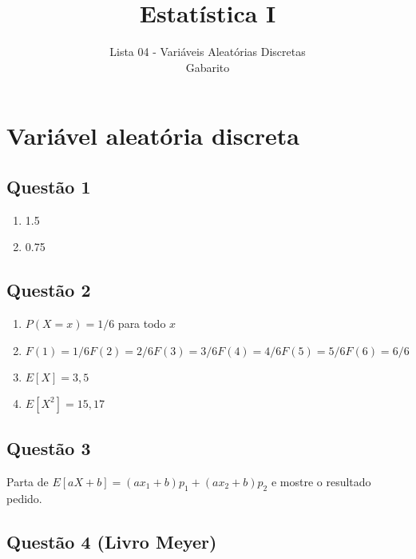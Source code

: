\documentclass[
]{article}
\title{Estatística I}
\subtitle{Lista 04 - Variáveis Aleatórias Discretas\\
Gabarito}
\author{}
\date{\vspace{-2.5em}}
\begin{document}
\maketitle

\hypertarget{variuxe1vel-aleatuxf3ria-discreta}{%
\section{Variável aleatória
discreta}\label{variuxe1vel-aleatuxf3ria-discreta}}

\hypertarget{questuxe3o-1}{%
\subsection{Questão 1}\label{questuxe3o-1}}

\begin{enumerate}
\def\labelenumi{\alph{enumi})}
\item
  1.5
\item
  0.75
\end{enumerate}

\hypertarget{questuxe3o-2}{%
\subsection{Questão 2}\label{questuxe3o-2}}

\begin{enumerate}
\def\labelenumi{\alph{enumi})}
\item
  \(P(X=x) = 1/6\) para todo \(x\)
\item
  \(F(1) = 1/6 F(2) = 2/6 F(3) = 3/6 F(4) = 4/6 F(5) = 5/6 F(6) = 6/6\)
\item
  \(E[X] = 3,5\)
\item
  \(E[X^2] = 15,17\)
\end{enumerate}

\hypertarget{questuxe3o-3}{%
\subsection{Questão 3}\label{questuxe3o-3}}

Parta de \(E[aX+b] = (ax_1 + b)p_1 + (ax_2 + b)p_2\) e mostre o
resultado pedido.

\hypertarget{questuxe3o-4-livro-meyer}{%
\subsection{Questão 4 (Livro Meyer)}\label{questuxe3o-4-livro-meyer}}
\end{document}
